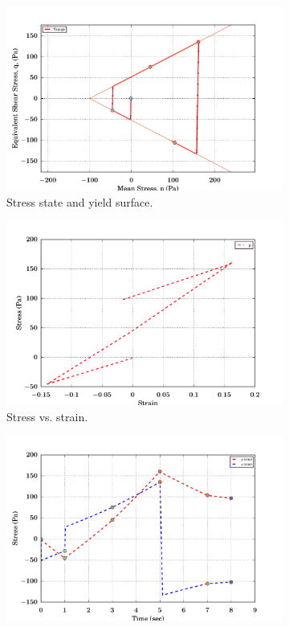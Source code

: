 \begin{figure}[htbp!]
  \begin{subfigure}{0.5\textwidth}
    \centering
    \includegraphics[width=\textwidth]{MPMMaterials/FIGS/UniaxialStrainLoadUnloadDPNonLin_yield_surface.pdf}
    \caption{Stress state and yield surface.}
  \end{subfigure}
  \begin{subfigure}{0.5\textwidth}
    \centering
    \includegraphics[width=\textwidth]{MPMMaterials/FIGS/UniaxialStrainLoadUnloadDPNonLin_sigma_eps.pdf}
    \caption{Stress vs. strain.}
  \end{subfigure}
  \begin{subfigure}{0.5\textwidth}
    \centering
    \includegraphics[width=\textwidth]{MPMMaterials/FIGS/UniaxialStrainLoadUnloadDPNonLin_pq_time.pdf}

\end{subfigure}
\end{figure}
